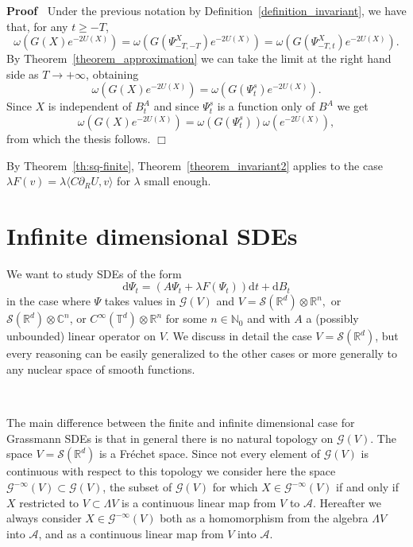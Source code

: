 \documentclass{article}
\newcommand{\mathd}{\mathrm{d}}
\newenvironment{proof}{\noindent\textbf{Proof\ }}{\hspace*{\fill}$\Box$\medskip}
\begin{document}
\begin{proof}
  Under the previous notation by Definition~\ref{definition_invariant}, we
  have that, for any $t \geqslant - T$,
  \[ \omega (G (X) e^{- 2 U (X)}) = \omega (G (\Psi_{- T, - T}^X) e^{- 2 U
     (X)}) = \omega (G (\Psi_{- T, t}^X) e^{- 2 U (X)}) . \]
  By Theorem~\ref{theorem_approximation} we can take the limit at the right
  hand side as $T \rightarrow + \infty$, obtaining
  \[ \omega (G (X) e^{- 2 U (X)}) = \omega (G (\Psi^s_t) e^{- 2 U (X)}) . \]
  Since $X$ is independent of $B^A_t$ and since $\Psi^s_t$ is a function only
  of $B^A$ we get
  \[ \omega (G (X) e^{- 2 U (X)}) = \omega (G (\Psi^s_t)) \omega (e^{- 2 U
     (X)}), \]
  from which the thesis follows.
\end{proof}

\begin{remark}
  \label{remark_invariant2}By Theorem~\ref{th:sq-finite},
  Theorem~\ref{theorem_invariant2} applies to the case $\lambda F (v) =
  \lambda \langle C \partial_R U, v \rangle$ for $\lambda$ small enough.
\end{remark}

\section{Infinite dimensional SDEs}\label{sec:infinite-dim}

We want to study SDEs of the form
\begin{equation}
  \mathd \Psi_t = (A \Psi_t + \lambda F (\Psi_t)) \mathd t + \mathd B_t
  \label{eq:infinite5}
\end{equation}
in the case where $\Psi$ takes values in $\mathcal{G} (V)$ and $V =\mathcal{S}
(\mathbb{R}^d) \otimes \mathbb{R}^n,$ or $\mathcal{S} (\mathbb{R}^d) \otimes
\mathbb{C}^n$, or $C^{\infty} (\mathbb{T}^d) \otimes \mathbb{R}^n$ for some $n
\in \mathbb{N}_0$ and with $A$ a (possibly unbounded) linear operator on $V$.
We discuss in detail the case $V = \mathcal{S} (\mathbb{R}^d)$, but every
reasoning can be easily generalized to the other cases or more generally to
any nuclear space of smooth functions.

\

The main difference between the finite and infinite dimensional case for
Grassmann SDEs is that in general there is no natural topology on $\mathcal{G}
(V)$. The space $V = \mathcal{S} (\mathbb{R}^d)$ is a Fr{\'e}chet space. Since
not every element of $\mathcal{G} (V)$ is continuous with respect to this
topology we consider here the space $\mathcal{G}^{- \infty} (V) \subset
\mathcal{G} (V)$, the subset of $\mathcal{G} (V)$ for which $X \in
\mathcal{G}^{- \infty} (V)$ if and only if $X$ restricted to $V \subset
\Lambda V$ is a continuous linear map from $V$ to $\mathcal{A}$. Hereafter we
always consider $X \in \mathcal{G}^{- \infty} (V)$ both as a homomorphism
from the algebra $\Lambda V$ into $\mathcal{A}$, and as a continuous linear
map from $V$ into $\mathcal{A}$.
\end{document}
